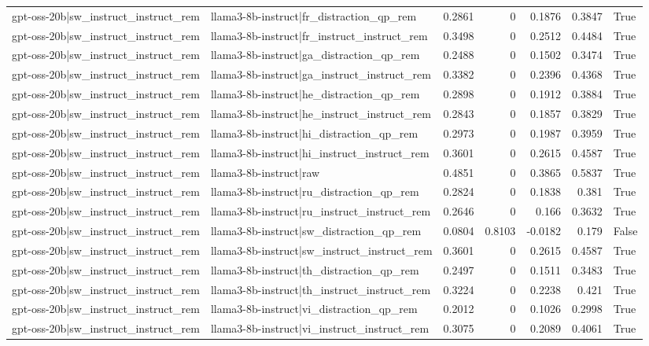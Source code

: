 \begin{table}
\begin{tabular}{l l r r r r l}
gpt-oss-20b|sw_instruct_instruct_rem & llama3-8b-instruct|fr_distraction_qp_rem & 0.2861 & 0 & 0.1876 & 0.3847 & True \\
gpt-oss-20b|sw_instruct_instruct_rem & llama3-8b-instruct|fr_instruct_instruct_rem & 0.3498 & 0 & 0.2512 & 0.4484 & True \\
gpt-oss-20b|sw_instruct_instruct_rem & llama3-8b-instruct|ga_distraction_qp_rem & 0.2488 & 0 & 0.1502 & 0.3474 & True \\
gpt-oss-20b|sw_instruct_instruct_rem & llama3-8b-instruct|ga_instruct_instruct_rem & 0.3382 & 0 & 0.2396 & 0.4368 & True \\
gpt-oss-20b|sw_instruct_instruct_rem & llama3-8b-instruct|he_distraction_qp_rem & 0.2898 & 0 & 0.1912 & 0.3884 & True \\
gpt-oss-20b|sw_instruct_instruct_rem & llama3-8b-instruct|he_instruct_instruct_rem & 0.2843 & 0 & 0.1857 & 0.3829 & True \\
gpt-oss-20b|sw_instruct_instruct_rem & llama3-8b-instruct|hi_distraction_qp_rem & 0.2973 & 0 & 0.1987 & 0.3959 & True \\
gpt-oss-20b|sw_instruct_instruct_rem & llama3-8b-instruct|hi_instruct_instruct_rem & 0.3601 & 0 & 0.2615 & 0.4587 & True \\
gpt-oss-20b|sw_instruct_instruct_rem & llama3-8b-instruct|raw & 0.4851 & 0 & 0.3865 & 0.5837 & True \\
gpt-oss-20b|sw_instruct_instruct_rem & llama3-8b-instruct|ru_distraction_qp_rem & 0.2824 & 0 & 0.1838 & 0.381 & True \\
gpt-oss-20b|sw_instruct_instruct_rem & llama3-8b-instruct|ru_instruct_instruct_rem & 0.2646 & 0 & 0.166 & 0.3632 & True \\
gpt-oss-20b|sw_instruct_instruct_rem & llama3-8b-instruct|sw_distraction_qp_rem & 0.0804 & 0.8103 & -0.0182 & 0.179 & False \\
gpt-oss-20b|sw_instruct_instruct_rem & llama3-8b-instruct|sw_instruct_instruct_rem & 0.3601 & 0 & 0.2615 & 0.4587 & True \\
gpt-oss-20b|sw_instruct_instruct_rem & llama3-8b-instruct|th_distraction_qp_rem & 0.2497 & 0 & 0.1511 & 0.3483 & True \\
gpt-oss-20b|sw_instruct_instruct_rem & llama3-8b-instruct|th_instruct_instruct_rem & 0.3224 & 0 & 0.2238 & 0.421 & True \\
gpt-oss-20b|sw_instruct_instruct_rem & llama3-8b-instruct|vi_distraction_qp_rem & 0.2012 & 0 & 0.1026 & 0.2998 & True \\
gpt-oss-20b|sw_instruct_instruct_rem & llama3-8b-instruct|vi_instruct_instruct_rem & 0.3075 & 0 & 0.2089 & 0.4061 & True \\

\end{tabular}
\end{table}
